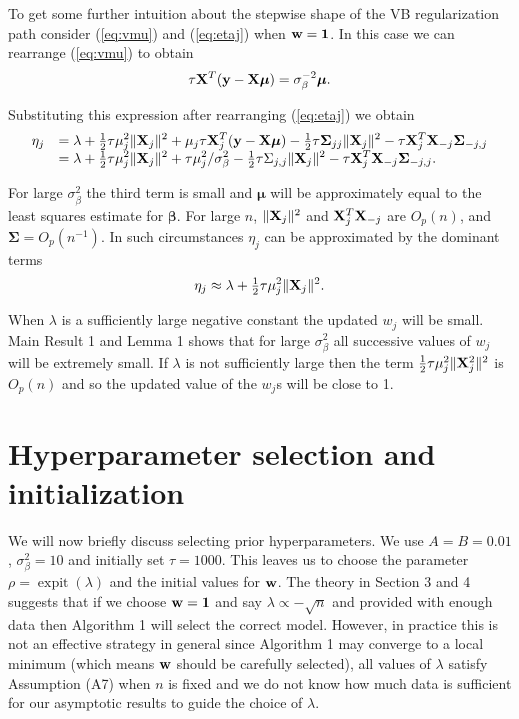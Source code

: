 \documentclass[11pt]{article}
\newtheorem{Main Result}{Main Result}
\def\vectorfontone{\bf}
\def\vectorfonttwo{\boldsymbol}
\def\vw{{\vectorfontone w}}                      %
\def\vy{{\vectorfontone y}}                      %
\def\vone{{\vectorfontone 1}}
\def\vbeta{{\vectorfonttwo \beta}}               %
\def\vmu{{\vectorfonttwo \mu}}                   %
\def\matrixfontone{\bf}
\def\matrixfonttwo{\boldsymbol}
\def\mX{{\matrixfontone X}}                      %
\def\mSigma{{\matrixfonttwo \Sigma}}             %
\def\ds{\displaystyle}
\DeclareMathOperator{\expit}{expit}
\newcommand{\joc}[1]{{\color{black}#1}}
\begin{document}
\smallskip 
{} \joc{
	To get some further intuition about the stepwise shape of the VB regularization path
	consider (\ref{eq:vmu}) and (\ref{eq:etaj}) when $\vw = \vone$. In this case
	we can rearrange (\ref{eq:vmu}) to obtain
	$$
	\tau \mX^T(\vy - \mX\vmu) = \sigma_\beta^{-2} \vmu.
	$$
	
	\noindent Substituting this expression after rearranging (\ref{eq:etaj}) we obtain
	$$
	\begin{array}{rl}
	\ds \eta_j 
	& \ds = \lambda 
	+ \tfrac{1}{2}\tau \mu_j^2 \|\mX_j\|^2 
	+ \mu_j \tau\mX_j^T(\vy - \mX\vmu) 
	- \tfrac{1}{2}\tau\mSigma_{jj}\|\mX_j\|^2
	- \tau\mX_j^T\mX_{-j}\mSigma_{-j,j} \\
	& \ds = \lambda 
	+ \tfrac{1}{2}\tau \mu_j^2 \|\mX_j\|^2 
	+ \tau\mu_j^2 /\sigma_\beta^2
	- \tfrac{1}{2}\tau\Sigma_{j,j}\|\mX_j\|^2
	- \tau\mX_j^T\mX_{-j}\mSigma_{-j,j}.
	\end{array} 
	$$
	
	\noindent For large $\sigma_\beta^2$ the third term is small and $\vmu$
	will be approximately equal to the least squares estimate for $\vbeta$. 
	For large $n$, $\|\mX_j\|^2$ and $\mX_j^T\mX_{-j}$ are $O_p(n)$, and $\mSigma=O_p(n^{-1})$. 
	In such circumstances $\eta_j$ can be approximated by the dominant terms
	$$
	\ds \eta_j \approx \lambda + \tfrac{1}{2}\tau \mu_j^2 \|\mX_j\|^2.
	$$
	
	\noindent When $\lambda$ is a sufficiently large negative constant the updated $w_j$ will be small.
	Main Result 1 and Lemma 1 shows that for large $\sigma_\beta^2$ all successive
	values of $w_j$ will be extremely small. If $\lambda$ is not sufficiently large
	then the term $\tfrac{1}{2}\tau \mu_j^2 \|\mX_j^2\|^2$ is $O_p(n)$ and so
	the updated value of the $w_j$s will be close to 1.
}





 


\section{Hyperparameter selection and initialization}
\label{sec:Parameter Selection and Initialization}

We will now briefly discuss selecting prior hyperparameters. We 
use $A=B=0.01$, $\sigma_\beta^2 = 10$ and initially set $\tau=1000$.
This leaves us to choose the parameter $\rho = \expit(\lambda)$
and the initial values for $\vw$.
The theory in Section 3 and 4 suggests
that if we choose $\vw=\vone$ and say $\lambda \propto -\sqrt{n}$ and
provided with enough data then Algorithm 1 will select the correct
model. However, in practice this is not an effective strategy in general
since Algorithm 1 may converge to a local minimum (which means $\vw$ should
be carefully selected), all values of $\lambda$ satisfy Assumption (A7)
when $n$ is fixed and we do not know how much data is sufficient for our
asymptotic results to guide the choice of $\lambda$.
\end{document}
